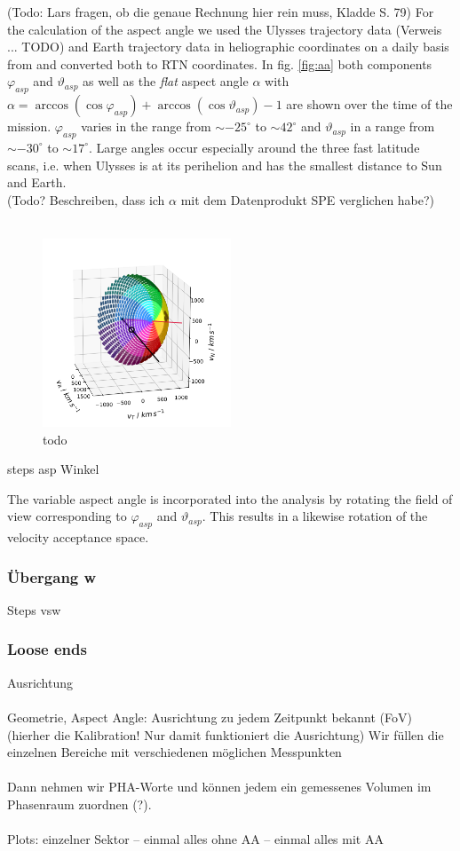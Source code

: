 (Todo: Lars fragen, ob die genaue Rechnung hier rein muss, Kladde S. 79)
For the calculation of the aspect angle we used the Ulysses trajectory data (Verweis ... TODO) and Earth trajectory data in heliographic coordinates on a daily basis from \citet{nasa-earth-coord} and converted both to RTN coordinates. In fig. \ref{fig:aa} both components $\varphi_{asp}$ and $\vartheta_{asp}$ as well as the \textit{flat} aspect angle $\alpha$ with  $\alpha = \arccos(\cos{\varphi_{asp}}) + \arccos(\cos{\vartheta_{asp}}) -1$ are shown over the time of the mission. $\varphi_{asp}$ varies in the range from $\sim - 25^\circ$ to $\sim 42^\circ$ and $\vartheta_{asp}$ in a range from $\sim - 30^\circ$ to $\sim 17^\circ$. Large angles occur especially around the three fast latitude scans, i.e. when Ulysses is at its perihelion and has the smallest distance to Sun and Earth.\\
(Todo? Beschreiben, dass ich $\alpha$ mit dem Datenprodukt SPE verglichen habe?)
\\ \\

\begin{figure}[h]
	\includegraphics[width=0.5\textwidth]{Figures/col_aa_marker.png}
	\centering
	\caption{todo}
	\label{todo}
\end{figure}
steps asp Winkel

The variable aspect angle is incorporated into the analysis by rotating the field of view corresponding to $\varphi_{asp}$ and $\vartheta_{asp}$. This results in a likewise rotation of the velocity acceptance space. 
\subsubsection{Übergang w}
Steps vsw


\subsubsection{Loose ends}
Ausrichtung
\\ \\
Geometrie, Aspect Angle: Ausrichtung zu jedem Zeitpunkt bekannt
(FoV) (hierher die Kalibration! Nur damit funktioniert die Ausrichtung)
Wir füllen die einzelnen Bereiche mit verschiedenen möglichen Messpunkten\\ \\
Dann nehmen wir PHA-Worte und können jedem ein gemessenes Volumen im Phasenraum zuordnen (?).
\\ \\
Plots: einzelner Sektor -- einmal alles ohne AA -- einmal alles mit AA
%

